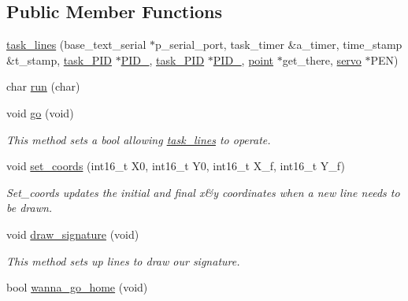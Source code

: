 \subsection*{Public Member Functions}
\begin{DoxyCompactItemize}
\item 
\hyperlink{classtask__lines_a0d04d45a83ecf3894cdb6c98942e97b6}{task\-\_\-lines} (base\-\_\-text\-\_\-serial $\ast$p\-\_\-serial\-\_\-port, task\-\_\-timer \&a\-\_\-timer, time\-\_\-stamp \&t\-\_\-stamp, \hyperlink{classtask___p_i_d}{task\-\_\-\-P\-I\-D} $\ast$\hyperlink{classtask__lines_af20c4404da342292d6e8e8a7a6004af2}{P\-I\-D\-\_}, \hyperlink{classtask___p_i_d}{task\-\_\-\-P\-I\-D} $\ast$\hyperlink{classtask__lines_ac53057e78b84eeb3576ee7ffb2380981}{P\-I\-D\-\_}, \hyperlink{classpoint}{point} $\ast$get\-\_\-there, \hyperlink{classservo}{servo} $\ast$P\-E\-N)
\item 
char \hyperlink{classtask__lines_adc52a1f1de31103830a06737db769a34}{run} (char)
\item 
\hypertarget{classtask__lines_a58abf21c099eba3afd75e01a41aac160}{void \hyperlink{classtask__lines_a58abf21c099eba3afd75e01a41aac160}{go} (void)}\label{classtask__lines_a58abf21c099eba3afd75e01a41aac160}

\begin{DoxyCompactList}\small\item\em This method sets a bool allowing \hyperlink{classtask__lines}{task\-\_\-lines} to operate. \end{DoxyCompactList}\item 
\hypertarget{classtask__lines_aa4d45fa38ffb509df4587afaf920f5d1}{void \hyperlink{classtask__lines_aa4d45fa38ffb509df4587afaf920f5d1}{set\-\_\-coords} (int16\-\_\-t X0, int16\-\_\-t Y0, int16\-\_\-t X\-\_\-f, int16\-\_\-t Y\-\_\-f)}\label{classtask__lines_aa4d45fa38ffb509df4587afaf920f5d1}

\begin{DoxyCompactList}\small\item\em Set\-\_\-coords updates the initial and final x\&y coordinates when a new line needs to be drawn. \end{DoxyCompactList}\item 
\hypertarget{classtask__lines_a8182baeb4e6d6608bb0b9d5bf7ee02d1}{void \hyperlink{classtask__lines_a8182baeb4e6d6608bb0b9d5bf7ee02d1}{draw\-\_\-signature} (void)}\label{classtask__lines_a8182baeb4e6d6608bb0b9d5bf7ee02d1}

\begin{DoxyCompactList}\small\item\em This method sets up lines to draw our signature. \end{DoxyCompactList}\item 
\hypertarget{classtask__lines_af24660494d5ef22eb6c03a007c7347a1}{bool \hyperlink{classtask__lines_af24660494d5ef22eb6c03a007c7347a1}{wanna\-\_\-go\-\_\-home} (void)}\label{classtask__lines_af24660494d5ef22eb6c03a007c7347a1}


\end{DoxyCompactItemize}
